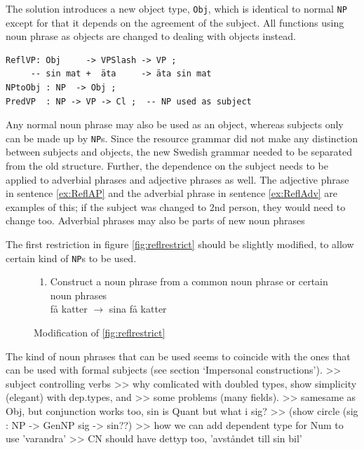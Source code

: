 \documentclass{report}
\begin{document}
The solution introduces a new object type, \verb_Obj_, which is
identical to normal \verb_NP_ except for that it depends on the agreement of
the subject. All functions using noun phrase as objects are changed to dealing
with objects instead.
\begin{verbatim}
ReflVP: Obj     -> VPSlash -> VP ;
     -- sin mat +  äta     -> äta sin mat 
NPtoObj : NP  -> Obj ;
PredVP  : NP -> VP -> Cl ;  -- NP used as subject
\end{verbatim}
Any normal noun phrase may also be used as an object, whereas subjects only
can be made up by \verb-NP-s.
Since the resource grammar did not make any distinction between
subjects and objects, the new Swedish grammar needed to be separated from the old
structure. 
Further, the dependence on the subject needs to be applied to adverbial phrases and
adjective phrases as well. The adjective phrase in sentence \ref{ex:ReflAP} and
the adverbial phrase in sentence \ref{ex:ReflAdv} are examples of this; if the
subject was changed to 2nd person, they  would need to change too.
 \label{ex:ReflAP2}
\vspace{-2mm}
 \label{ex:ReflAdv2}
Adverbial phrases may also be parts of new noun phrases

The first restriction in figure \ref{fig:reflrestrict} should be slightly
modified, to allow certain kind of \verb|NP|s to be used.
\begin{figure}[h]
\begin{enumerate}
\item{
Construct a noun phrase from a common noun phrase or certain noun phrases \\
få katter $\rightarrow$ sina få katter} 
\end{enumerate}
\caption{Modification of \ref{fig:reflrestrict}}
\end{figure}

The kind of noun phrases that can be used seems to coincide with the ones
that can be used with formal subjects (see section `Impersonal constructions').
>> subject controlling verbs
>> why comlicated with doubled types, show simplicity (elegant) with dep.types, and
>> some problems (many fields).
>> samesame as Obj, but conjunction works too, sin is Quant but what i sig?
>> (show circle (sig : NP -> GenNP sig -> sin??)
>> how we can add dependent type for Num to use 'varandra'
>> CN should have dettyp too, 'avståndet till sin bil'
\end{document}
